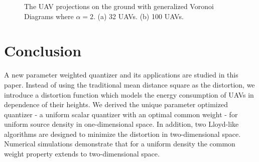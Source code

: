 \documentclass[smallabstract,smallcaptions]{dccpaper}
\begin{document}
\begin{figure}[t]
\centering
{}
\hfil
{}
\captionsetup{justification=justified}
\vspace{-2ex}
\caption{\small{The UAV projections on the ground with generalized Voronoi Diagrams where $\alpha=2$. 
(a) 32 UAVs. (b) 100 UAVs.}}
\label{Distortion_region}
\end{figure}

\section{Conclusion}
%
A new parameter weighted quantizer and its applications are studied in this paper. Instead of using the traditional mean
distance square as the distortion, we introduce a distortion function which models the energy consumption of UAVs in
dependence of their heights.  We derived the unique parameter optimized quantizer - a uniform scalar quantizer with an
optimal common weight - for uniform source density in one-dimensional space.  In addition, two Lloyd-like algorithms are
designed to minimize the distortion in two-dimensional space.  Numerical simulations demonstrate that for a uniform
density the common weight property extends to two-dimensional space.
\end{document}
